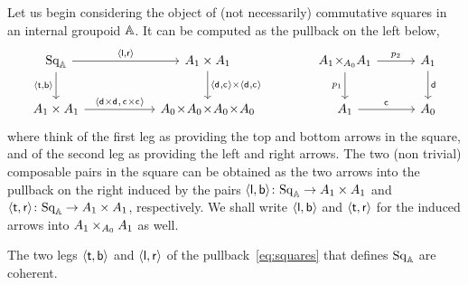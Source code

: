 \documentclass[a4paper,11pt]{amsart}
\newcommand{\sqincat}[1]{\mathrm{Sq}_{#1}}
\newcommand{\Asqin}{\sqincat{\Agpdf}}
\begin{document}
Let us begin considering the object of (not necessarily) commutative squares in an internal groupoid $\mathbb{A}$.
It can be computed as the pullback on the left below,
\begin{equation}\label{eq:squares}
\begin{tikzcd}[column sep=13ex, row sep=5ex]
	\Asqin	\ar[r,"\ple{\mathsf{l},\mathsf{r}}"] \ar[d,"\ple{\mathsf{t},\mathsf{b}}"']
	&	\Aargpdf\times\Aargpdf	\ar[d,"\ple{\domincat{},\codincat{}}\times\ple{\domincat{},\codincat{}}"]
	\\
	\Aargpdf\times\Aargpdf	\ar[r,"\ple{\domincat{}\times \domincat{},\,\codincat{}\times \codincat{}}"]
	&	A_0\stimes A_0\stimes A_0\stimes A_0
\end{tikzcd}
\hspace{9ex}
\begin{tikzcd}[column sep=7ex, row sep=5ex]
	\Aargpdf \stimes_{\!\Aobgpdf} \Aargpdf	\ar[d,"p_1"'] \ar[r,"p_2"]
	&	\Aargpdf	\ar[d,"\domincat{}"]
	\\
	\Aargpdf	\ar[r,"\codincat{}"]	&	\Aobgpdf
\end{tikzcd}
\end{equation}
where think of the first leg as providing the top and bottom arrows in the square,
and of the second leg as providing the left and right arrows.
The two (non trivial) composable pairs in the square can be obtained as the two arrows into the pullback on the right induced by the pairs $\ple{\mathsf{l},\mathsf{b}}\colon \Asqin\to \Aargpdf \times \Aargpdf$ and $\ple{\mathsf{t},\mathsf{r}}\colon \Asqin\to \Aargpdf \times \Aargpdf$, respectively.
We shall write $\langle{\mathsf{l},\mathsf{b}}\rangle$ and $\langle{\mathsf{t},\mathsf{r}}\rangle$ for the induced arrows into ${A}_1 \times_{{A}_0}{A}_1$ as well.

\begin{lem}\label{lem:squares}
The two legs $\langle{\mathsf{t},\mathsf{b}}\rangle$ and $\langle{\mathsf{l},\mathsf{r}}\rangle$ of the pullback~\eqref{eq:squares} that defines $\Asqin$ are coherent.
\end{lem}
\end{document}
